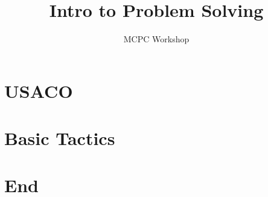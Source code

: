 \documentclass{beamer}
\title[Monash Competitive Programming Club]{Intro to Problem Solving}
\subtitle {MCPC Workshop}
\date{}
\author[Eggeek (Shizhe Zhao)]{
}
\begin{document}

\frame{\titlepage}
\section[]{}

\section{USACO}

\section{Basic Tactics}

\section{End}

\end{document}
